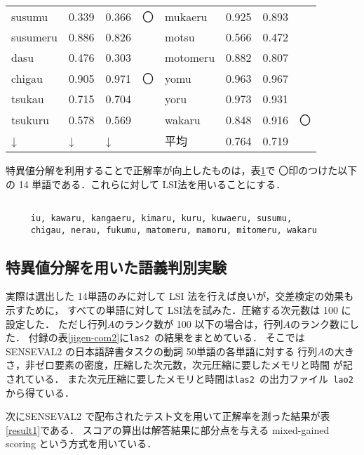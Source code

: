 \begin{table}[htbp]
\begin{center}
\begin{tabular}{|p{}|p{}|p{}p{}||p{}|p{}|p{}p{}|}
susumu     &  0.339  & 0.366 & 〇   &      mukaeru    &  0.925  & 0.893 &       \\
susumeru   &  0.886  & 0.826 &      &      motsu      &  0.566  & 0.472 &       \\
dasu       &  0.476  & 0.303 &      &      motomeru   &  0.882  & 0.807 &       \\
chigau     &  0.905  & 0.971 & 〇   &      yomu       &  0.963  & 0.967 &       \\
tsukau     &  0.715  & 0.704 &      &      yoru       &  0.973  & 0.931 &       \\
tsukuru    &  0.578  & 0.569 &      &      wakaru     &  0.848  & 0.916 & 〇    \\ \hline
  ↓  &   ↓    &     ↓     &        &   平均        &  0.764  &  0.719  & \\  \hline
    \end{tabular}\label{kousakekka}
  \end{center}
\end{table}

特異値分解を利用することで正解率が向上したものは，\mbox{表\ref{kousakekka}}で
〇印のつけた以下の 14 単語である．これらに対して LSI法を用いることにする．

\begin{verbatim}

     iu, kawaru, kangaeru, kimaru, kuru, kuwaeru, susumu, 
     chigau, nerau, fukumu, matomeru, mamoru, mitomeru, wakaru

\end{verbatim}
\newpage

\subsection{特異値分解を用いた語義判別実験}

実際は選出した 14単語のみに対して LSI 法を行えば良いが，交差検定の効果も示すために，
すべての単語に対して LSI法を試みた．圧縮する次元数は 100 に設定した．
ただし行列\( A \)のランク数が 100 以下の場合は，行列\( A \)のランク数にした．
付録の\mbox{表\ref{jigen-com2}}に{\tt las2 }の結果をまとめている．
そこではSENSEVAL2 の日本語辞書タスクの動詞 50単語の各単語に対する
行列\( A \)の大きさ，非ゼロ要素の密度，圧縮した次元数，次元圧縮に要したメモリと時間
が記されている．
また次元圧縮に要したメモリと時間は{\tt las2 }の出力ファイル\verb| lao2 |から得ている．

次にSENSEVAL2 で配布されたテスト文を用いて正解率を測った結果が\mbox{表\ref{result1}}である．
スコアの算出は解答結果に部分点を与える mixed-gained scoring という方式\cite{sen2}を用いている．

